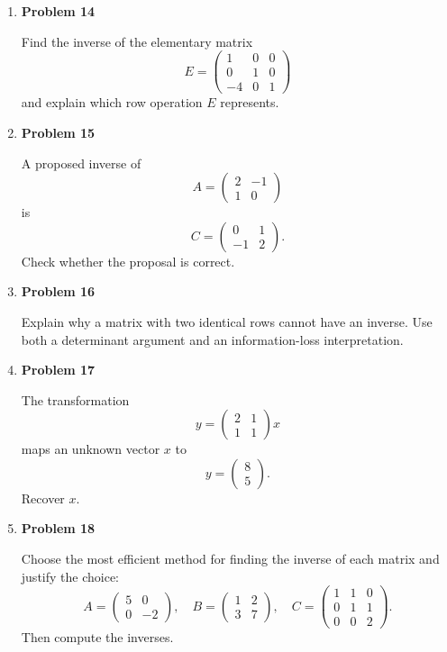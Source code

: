 \begin{enumerate}
\item \textbf{Problem 14}\par
Find the inverse of the elementary matrix
\[
E=\begin{pmatrix}
1&0&0\\
0&1&0\\
-4&0&1
\end{pmatrix}
\]
and explain which row operation \(E\) represents.

\item \textbf{Problem 15}\par
A proposed inverse of
\[
A=\begin{pmatrix}2&-1\\1&0\end{pmatrix}
\]
is
\[
C=\begin{pmatrix}0&1\\-1&2\end{pmatrix}.
\]
Check whether the proposal is correct.

\item \textbf{Problem 16}\par
Explain why a matrix with two identical rows cannot have an inverse. Use both a determinant argument and an information-loss interpretation.

\item \textbf{Problem 17}\par
The transformation
\[
y=
\begin{pmatrix}2&1\\1&1\end{pmatrix}x
\]
maps an unknown vector \(x\) to
\[
y=\begin{pmatrix}8\\5\end{pmatrix}.
\]
Recover \(x\).

\item \textbf{Problem 18}\par
Choose the most efficient method for finding the inverse of each matrix and justify the choice:
\[
A=\begin{pmatrix}5&0\\0&-2\end{pmatrix},
\quad
B=\begin{pmatrix}1&2\\3&7\end{pmatrix},
\quad
C=\begin{pmatrix}1&1&0\\0&1&1\\0&0&2\end{pmatrix}.
\]
Then compute the inverses.


\end{enumerate}
